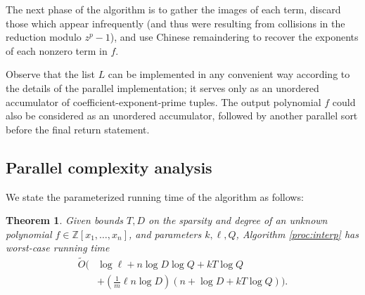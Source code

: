 \documentclass[letterpaper,10pt]{article}
\newtheorem{theorem}{Theorem}
\newcommand{\ZZ}{\ensuremath{\mathbb{Z}}}
\newcommand{\softoh}{\ensuremath{\widetilde{O}}}
\begin{document}
The next phase of the algorithm is to gather the images of each term,
discard those which appear infrequently (and thus were resulting from
collisions in the reduction modulo $z^p-1$), and use Chinese
remaindering to recover the exponents of each nonzero term in $f$.

Observe that the list $L$ can be implemented in any convenient way
according to the details of the parallel implementation; it serves only
as an unordered accumulator of coefficient-exponent-prime tuples.
The output polynomial $f$ could also be considered as an unordered
accumulator, followed by another parallel sort before the final return
statement.

\subsection{Parallel complexity analysis}

We state the parameterized running time of the algorithm as follows:

\begin{theorem}\label{thm:rtime}
  Given bounds $T,D$ on the sparsity and degree of an unknown
  polynomial $f\in\ZZ[x_1,\ldots,x_n]$, and parameters $k,\ell,Q$,
  Algorithm \ref{proc:interp} has worst-case running time
  \begin{align*}
    \softoh\bigg(&\log \ell +
    n \log D \log Q +
    k T \log Q \\
    &+ \left(\tfrac{1}{m}\ell n \log D\right)\left(
      n + \log D + k T \log Q
    \right)
  \bigg).
  \end{align*}
\end{theorem}
\end{document}
